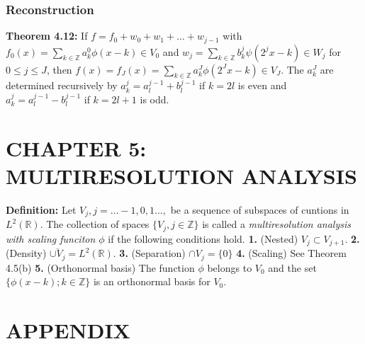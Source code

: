 \documentclass[a4paper]{article}
\newcommand{\R}{\mathbb{R}}
\newcommand{\Z}{\mathbb{Z}}
\begin{document}
\begin{multicols}{2}
\subsubsection*{Reconstruction}
{\bf Theorem 4.12:} If $f=f_0+w_0+w_1+\dots +w_{j-1}$ with $f_{0}(x)=\sum_{k\in\Z}a_k^0\phi(x-k)\in V_0$ and $w_{j}=\sum_{k\in\Z}b_k^{j}\psi(2^jx-k)\in W_{j}$ for $0\leq j\leq J$, then $f(x)=f_J(x)=\sum_{k\in\Z}a_k^J\phi(2^Jx-k)\in V_J$. The $a_k^J$ are determined recursively by $a_k^j = a_l^{j-1}+b_l^{j-1}$ if $k=2l$ is even and $a_k^j = a_l^{j-1}-b_l^{j-1}$ if $k=2l+1$ is odd.

\section*{CHAPTER 5: MULTIRESOLUTION ANALYSIS}
{\bf Definition:} Let $V_j, j=\dots -1,0,1\dots,$ be a sequence of subspaces of cuntions in $L^2(\R)$. The collection of spaces $\{V_j,j\in\Z\}$ is called a \textit{multiresolution analysis with scaling funciton $\phi$} if the following conditions hold. {\bf 1.} (Nested) $V_j\subset V_{j+1}$. {\bf 2.} (Density) $\overline{\cup V_j}=L^2(\R)$. {\bf 3.} (Separation) $\cap V_j=\{0\}$ {\bf 4.} (Scaling) See Theorem 4.5(b) {\bf 5.} (Orthonormal basis) The function $\phi$ belongs to $V_0$ and the set $\{\phi(x-k);k\in\Z\}$ is an orthonormal basis for $V_0$.

\section*{APPENDIX}


\end{multicols}
\end{document}
